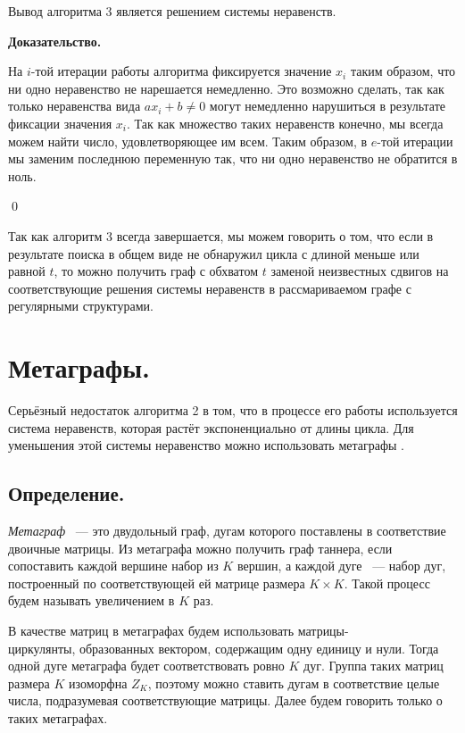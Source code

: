 \documentclass[14pt]{mmcs_article}
\begin{document}
Вывод алгоритма 3 является решением системы неравенств.

\textbf{Доказательство.}

На $i$-той итерации работы алгоритма фиксируется значение $x_i$ таким образом, что ни одно неравенство не нарешается немедленно. Это возможно сделать, так как только неравенства вида $ax_i + b \neq 0$ могут немедленно нарушиться в результате фиксации значения $x_i$. Так как множество таких неравенств конечно, мы всегда можем найти число, удовлетворяющее им всем. Таким образом, в $e$-той итерации мы заменим последнюю переменную так, что ни одно неравенство не обратится в ноль. 

\qed

Так как алгоритм 3 всегда завершается, мы можем говорить о том, что если в результате поиска в общем виде не обнаружил цикла с длиной меньше или равной $t$, то можно получить граф с обхватом $t$ заменой неизвестных сдвигов на соответствующие решения системы неравенств в рассмариваемом графе с регулярными структурами.

\newpage
\section{Метаграфы.}

Серьёзный недостаток алгоритма 2 в том, что в процессе его работы используется система неравенств, которая растёт экспоненциально от длины цикла. Для уменьшения этой системы неравенство можно использовать метаграфы \cite{metagraphs}.

\subsection{Определение.}

\textsl{Метаграф} ~--- это двудольный граф, дугам которого поставлены в соответствие двоичные матрицы. Из метаграфа можно получить граф таннера, если сопоставить каждой вершине набор из $K$ вершин, а каждой дуге ~--- набор дуг, построенный по соответствующей ей матрице размера $K \times K$. Такой процесс будем называть увеличением в $K$ раз. 

В качестве матриц в метаграфах будем использовать матрицы-\\циркулянты, образованных вектором, содержащим одну единицу и нули. Тогда одной дуге метаграфа будет соответствовать ровно $K$ дуг. Группа таких матриц размера $K$ изоморфна $Z_K$, поэтому можно ставить дугам в соответствие целые числа, подразумевая соответствующие матрицы. Далее будем говорить только о таких метаграфах.
\end{document}
